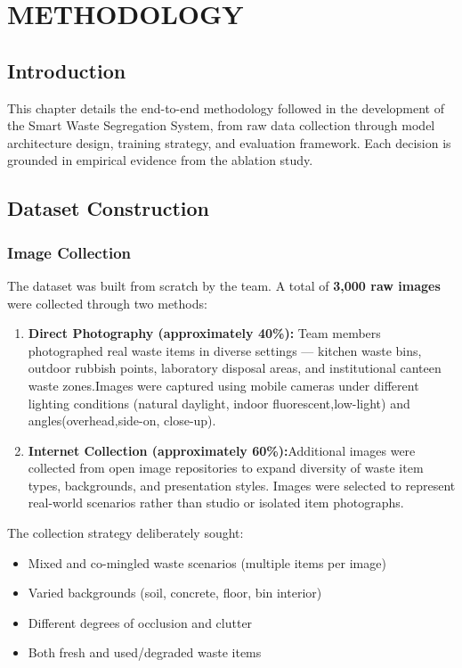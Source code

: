 \chapter{METHODOLOGY}

\section{Introduction}

This chapter details the end-to-end methodology followed in the development of the Smart Waste Segregation System, from raw data collection through model architecture design, training strategy, and evaluation framework. Each decision is grounded in empirical evidence from the ablation study.

\section{Dataset Construction}

\subsection{Image Collection}

The dataset was built from scratch by the team. A total of \textbf{3,000 raw images} were collected through two methods:

\begin{enumerate}
    \item \textbf{Direct Photography (approximately 40\%):} Team members photographed real waste items in diverse settings — kitchen waste bins, outdoor rubbish points, laboratory disposal areas, and institutional canteen waste zones.Images were captured using mobile cameras under different lighting conditions (natural daylight, indoor fluorescent,low-light) and angles(overhead,side-on, close-up).

    \item \textbf{Internet Collection (approximately 60\%):}Additional images were collected from open image repositories to expand diversity of waste item types, backgrounds, and presentation styles. Images were selected to represent real-world scenarios rather than studio or isolated item photographs.
\end{enumerate}

The collection strategy deliberately sought:
\begin{itemize}
    \item Mixed and co-mingled waste scenarios (multiple items per image)
    \item Varied backgrounds (soil, concrete, floor, bin interior)
    \item Different degrees of occlusion and clutter
    \item Both fresh and used/degraded waste items
\end{itemize}

